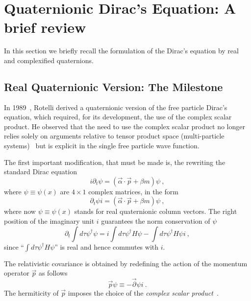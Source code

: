 

\section{Quaternionic Dirac's Equation: A brief review}
\label{s3}

In this section we briefly recall the formulation of the Dirac's equation by 
real and complexified quaternions.

\subsection{Real Quaternionic Version: The Milestone}
\label{s31}

In 1989~\cite{R}, Rotelli derived a quaternionic version of the free 
particle Dirac's equation, which required, for its development, the use of the 
complex scalar product. He observed that the need to use the complex 
scalar product no longer relies solely on arguments relative to tensor 
product space (multi-particle systems)~\cite{HB} but is explicit in the single 
free 
particle wave function.

The first important modification, that must be made is, the rewriting the 
standard Dirac equation
\[ i\partial_t \psi = \left( \vec{\alpha} \cdot \vec{p} + \beta m \right) 
\psi~,\]
where $\psi\equiv \psi(x)$ are $4\times 1$ complex matrices, in the form
\[ \partial_t \psi i = \left( \vec{\alpha} \cdot \vec{p} + \beta m \right) 
\psi~,\]
where now $\psi\equiv \psi(x)$ stands for real quaternionic column vectors.
The right position of the imaginary unit $i$ 
guarantees the norm conservation of $\psi$
\[ \partial_t \int d\tau \psi^{\dag} \psi =
   i \int d\tau \psi^{\dag} H \psi - 
   \int d\tau \psi^{\dag} H \psi i ~,\]
since ``$\int d\tau \psi^{\dag} H \psi$'' is real and hence commutes with $i$.

The relativistic covariance is obtained by redefining the action of the 
momentum operator $\vec{p}$ as follows
\[ \vec{p} \psi \equiv - \vec{\partial} \psi i~.\]
The hermiticity of $\vec{p}$ imposes the choice of the 
{\em complex scalar product}~\cite{R}.

